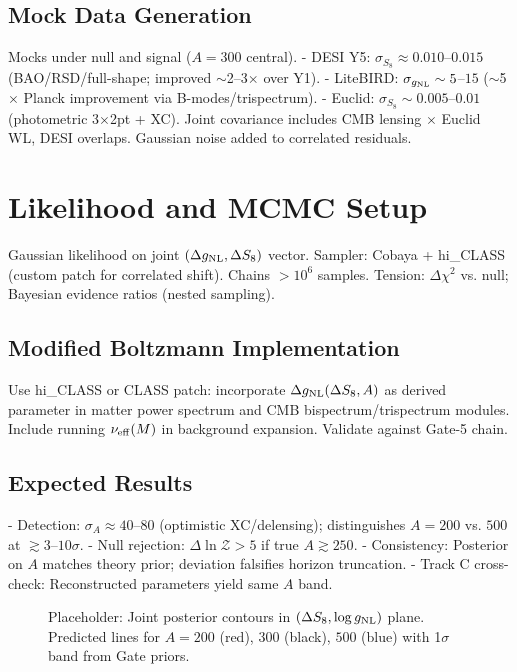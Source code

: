 \documentclass[12pt,a4paper]{article}
\begin{document}
\subsection{Mock Data Generation}
Mocks under null and signal ($A=300$ central).  
- DESI Y5: $\sigma_{S_8} \approx 0.010$–$0.015$ (BAO/RSD/full-shape; improved $\sim$2–3$\times$ over Y1).  
- LiteBIRD: $\sigma_{g_{\rm NL}} \sim 5$–$15$ ($\sim$5$\times$ Planck improvement via B-modes/trispectrum).  
- Euclid: $\sigma_{S_8} \sim 0.005$–$0.01$ (photometric 3$\times$2pt + XC).  
Joint covariance includes CMB lensing $\times$ Euclid WL, DESI overlaps. Gaussian noise added to correlated residuals.

\section{Likelihood and MCMC Setup}
Gaussian likelihood on joint $(\Delta g_{\rm NL}, \Delta S_8)$ vector.  
Sampler: Cobaya + hi_CLASS (custom patch for correlated shift). Chains $>10^6$ samples.  
Tension: $\Delta \chi^2$ vs. null; Bayesian evidence ratios (nested sampling).

\subsection{Modified Boltzmann Implementation}
Use hi_CLASS or CLASS patch: incorporate $\Delta g_{\rm NL}(\Delta S_8, A)$ as derived parameter in matter power spectrum and CMB bispectrum/trispectrum modules. Include running $\nu_{\rm eff}(M)$ in background expansion. Validate against Gate-5 chain.

\subsection{Expected Results}
- Detection: $\sigma_A \approx 40$–$80$ (optimistic XC/delensing); distinguishes $A=200$ vs. $500$ at $\gtrsim 3$–$10\sigma$.  
- Null rejection: $\Delta \ln\mathcal{Z} > 5$ if true $A \gtrsim 250$.  
- Consistency: Posterior on $A$ matches theory prior; deviation falsifies horizon truncation.  
- Track C cross-check: Reconstructed parameters yield same $A$ band.

\begin{figure}[h]
\centering
\caption{Placeholder: Joint posterior contours in $(\Delta S_8, \log g_{\rm NL})$ plane. Predicted lines for $A=200$ (red), $300$ (black), $500$ (blue) with 1$\sigma$ band from Gate priors.}
\label{fig:contours}
\end{figure}
\end{document}
